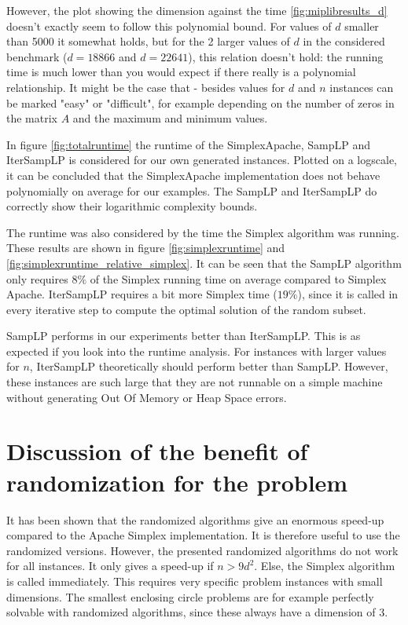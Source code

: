 \documentclass[nocopyrightspace]{acm_proc_article-sp}
\begin{document}
However, the plot showing the dimension against the time \ref{fig:miplibresults_d} doesn't exactly seem to follow this polynomial bound. For values of $d$ smaller than 5000 it somewhat holds, but for the 2 larger values of $d$ in the considered benchmark ($d=18866$ and $d=22641$), this relation doesn't hold: the running time is much lower than you would expect if there really is a polynomial relationship. It might be the case that - besides values for $d$ and $n$ instances can be marked "easy" or "difficult", for example depending on the number of zeros in the matrix $A$ and the maximum and minimum values.

In figure \ref{fig:totalruntime} the runtime of the SimplexApache, SampLP and IterSampLP is considered for our own generated instances. Plotted on a logscale, it can be concluded that the SimplexApache implementation does not behave polynomially on average for our examples. The SampLP and IterSampLP do correctly show their logarithmic complexity bounds. 

The runtime was also considered by the time the Simplex algorithm was running. These results are shown in figure \ref{fig:simplexruntime} and \ref{fig:simplexruntime_relative_simplex}. It can be seen that the SampLP algorithm only requires $8\%$ of the Simplex running time on average compared to Simplex Apache. IterSampLP requires a bit more Simplex time ($19\%$), since it is called in every iterative step to compute the optimal solution of the random subset.

SampLP performs in our experiments better than IterSampLP. This is as expected if you look into the runtime analysis. For instances with larger values for $n$, IterSampLP theoretically should perform better than SampLP. However, these instances are such large that they are not runnable on a simple machine without generating Out Of Memory or Heap Space errors.

\section{Discussion of the benefit of randomization for the problem}
It has been shown that the randomized algorithms give an enormous speed-up compared to the Apache Simplex implementation. It is therefore useful to use the randomized versions. However, the presented randomized algorithms do not work for all instances. It only gives a speed-up if $n>9d^2$. Else, the Simplex algorithm is called immediately. This requires very specific problem instances with small dimensions. The smallest enclosing circle problems are for example perfectly solvable with randomized algorithms, since these always have a dimension of 3.
\end{document}
